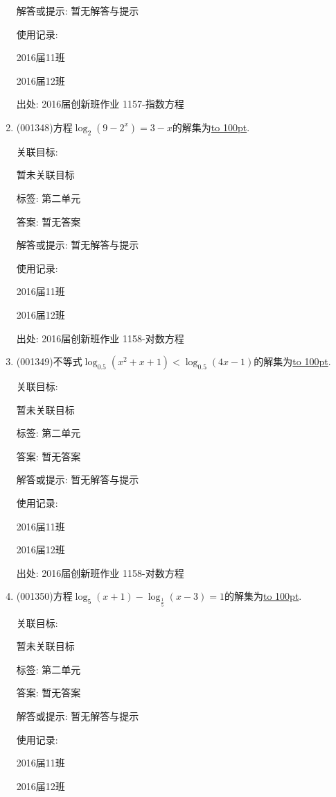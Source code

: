\documentclass[10pt,a4paper]{article}
\newcommand{\blank}[1]{\underline{\hbox to #1pt{}}}
\begin{document}
\begin{enumerate}[1.]
解答或提示: 暂无解答与提示

使用记录:

2016届11班	

2016届12班	


出处: 2016届创新班作业	1157-指数方程
\item { (001348)}方程$\log_2(9-2^x)=3-x$的解集为\blank{100}.


关联目标:

暂未关联目标



标签: 第二单元

答案: 暂无答案

解答或提示: 暂无解答与提示

使用记录:

2016届11班	

2016届12班	


出处: 2016届创新班作业	1158-对数方程
\item { (001349)}不等式$\log_{0.5}(x^2+x+1)<\log_{0.5}(4x-1)$的解集为\blank{100}.


关联目标:

暂未关联目标



标签: 第二单元

答案: 暂无答案

解答或提示: 暂无解答与提示

使用记录:

2016届11班	

2016届12班	


出处: 2016届创新班作业	1158-对数方程
\item { (001350)}方程$\log_5(x+1)-\log_{\frac{1}{5}}(x-3)=1$的解集为\blank{100}.


关联目标:

暂未关联目标



标签: 第二单元

答案: 暂无答案

解答或提示: 暂无解答与提示

使用记录:

2016届11班	

2016届12班	



\end{enumerate}
\end{document}

